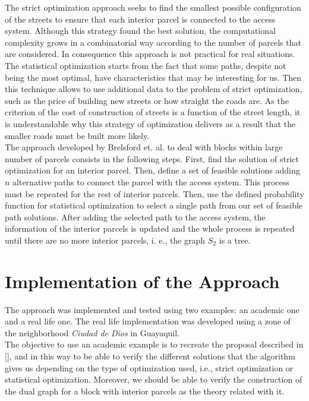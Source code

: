 \documentclass[10pt]{article}
\begin{document}
The strict optimization approach seeks to find the smallest possible configuration of the streets to ensure that each interior parcel is connected to the access system. Although this strategy found the best solution, the computational complexity grows in a combinatorial way according to the number of parcels that are considered. In consequence this approach is not practical for real situations.\\

The statistical optimization starts from the fact that some paths, despite not being the most optimal, have characteristics that may be interesting for us. Then this technique allows to use additional data to the problem of strict optimization, such as the price of building new streets or how straight the roads are. As the criterion of the cost of construction of streets is a function of the street length, it is understandable why this strategy of optimization delivers as a result that the smaller roads must be built more likely.\\

The approach developed by Brelsford et. al. to deal with blocks within large number of parcels consists in the following steps. First, find the solution of strict optimization for an interior parcel. Then, define a set of feasible solutions adding $n$ alternative paths to connect the parcel with the access system. This process must be repeated for the rest of interior parcels. Then, use the defined probability function for statistical optimization to select a single path from our set of feasible path solutions. After adding the selected path to the access system, the information of the interior parcels is updated and the whole process is repeated until there are no more interior parcels, i. e., the graph $ S_2 $ is a tree.

\section{Implementation of the Approach}
The approach was implemented and tested using two examples: an academic one and a real life one. The real life implementation was developed using a zone of the neighborhood \emph{Ciudad de Dios} in Guayaquil.\\

The objective to use an academic example is to recreate the proposal described in [], and in this way to be able to verify the different solutions that the algorithm gives us depending on the type of optimization used, i.e., strict optimization or statistical optimization. Moreover, we should be able to verify the construction of the dual graph for a block with interior parcels as the theory related with it.\\
\end{document}
